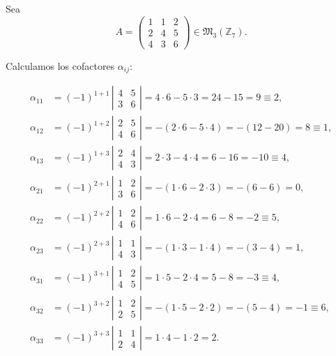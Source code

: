 \documentclass[a4paper,12pt]{article}
\begin{document}
\begin{ejemplo}[title=Ejemplo de cálculo de la matriz adjunta]
Sea
\[
A =
\begin{pmatrix}
1 & 1 & 2 \\
2 & 4 & 5 \\
4 & 3 & 6
\end{pmatrix} \in \mathfrak{M}_3(\mathbb{Z}_7).
\]

Calculamos los cofactores $\alpha_{ij}$:

\[
\begin{aligned}
\alpha_{11} &= (-1)^{1+1} \, \left|
\begin{matrix} 4 & 5 \\ 3 & 6 \end{matrix}\right| = 4\cdot 6 - 5\cdot 3 = 24-15 = 9 \equiv 2, \\
\alpha_{12} &= (-1)^{1+2} \, \left|
\begin{matrix} 2 & 5 \\ 4 & 6 \end{matrix}\right| = -(2\cdot 6 - 5\cdot 4) = -(12-20) = 8 \equiv 1, \\
\alpha_{13} &= (-1)^{1+3} \, \left|
\begin{matrix} 2 & 4 \\ 4 & 3 \end{matrix}\right| = 2\cdot 3 - 4\cdot 4 = 6-16 = -10 \equiv 4, \\
\alpha_{21} &= (-1)^{2+1} \, \left|
\begin{matrix} 1 & 2 \\ 3 & 6 \end{matrix}\right| = -(1\cdot 6 - 2\cdot 3) = -(6-6)=0, \\
\alpha_{22} &= (-1)^{2+2} \, \left|
\begin{matrix} 1 & 2 \\ 4 & 6 \end{matrix}\right| = 1\cdot 6 - 2\cdot 4 = 6-8=-2 \equiv 5, \\
\alpha_{23} &= (-1)^{2+3} \, \left|
\begin{matrix} 1 & 1 \\ 4 & 3 \end{matrix}\right| = -(1\cdot 3 -1\cdot 4)=-(3-4)=1, \\
\alpha_{31} &= (-1)^{3+1} \, \left|
\begin{matrix} 1 & 2 \\ 4 & 5 \end{matrix}\right| = 1\cdot 5 - 2\cdot 4 = 5-8=-3 \equiv 4, \\
\alpha_{32} &= (-1)^{3+2} \, \left|
\begin{matrix} 1 & 2 \\ 2 & 5 \end{matrix}\right| = -(1\cdot 5 - 2\cdot 2)=-(5-4)=-1 \equiv 6, \\
\alpha_{33} &= (-1)^{3+3} \, \left|
\begin{matrix} 1 & 1 \\ 2 & 4 \end{matrix}\right| = 1\cdot 4 -1\cdot 2 = 2.
\end{aligned}
\]


\end{ejemplo}
\end{document}
